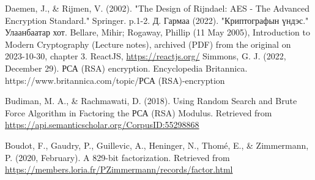 
\singlespace
{}
\begin{thebibliography}{}
	Daemen, J., \& Rijmen, V. (2002). "The Design of Rijndael: AES - The Advanced Encryption Standard." Springer. p.1-2.
	Д. Гармаа (2022). "Криптографын үндэс." Улаанбаатар хот.
	Bellare, Mihir; Rogaway, Phillip (11 May 2005), Introduction to Modern Cryptography (Lecture notes), archived (PDF) from the original on 2023-10-30, chapter 3.
	ReactJS, \url{https://reactjs.org/}
	Simmons, G. J. (2022, December 29). РСА (RSA) encryption. Encyclopedia Britannica. https://www.britannica.com/topic/РСА (RSA)-encryption

	Budiman, M. A., \& Rachmawati, D. (2018). Using Random Search and Brute Force Algorithm in Factoring the РСА (RSA) Modulus. Retrieved from \url{https://api.semanticscholar.org/CorpusID:55298868}

Boudot, F., Gaudry, P., Guillevic, A., Heninger, N., Thomé, E., \& Zimmermann, P. (2020, February). A 829-bit factorization. Retrieved from \url{https://members.loria.fr/PZimmermann/records/factor.html}



\end{thebibliography}